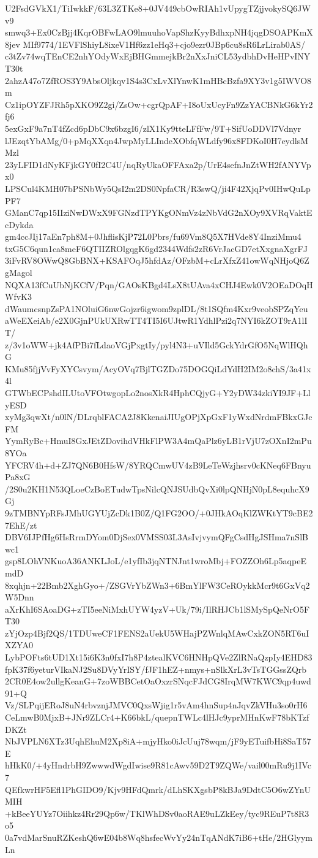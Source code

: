 U2FsdGVkX1/TiIwkkF/63L3ZTKe8+0JV449cbOwRIAh1vUpygTZjjvokySQ6JWv9
smwq3+Ex0CzBjj4KqrOBFwLAO9lmuuhoVapShzKyyBdhxpNH4jqgDSOAPKmX8jev
MIf9774/1EVFlShiyL8ixeV1Hf6zz1eHq3+cjo9ezr0JBp6cu8sR6LrLirab0AS/
c3tZv74wqTEnCE2nhYOdyWxEjBHGmmejkBr2nXxJniCL53ydbhDvHeHPvINYT30t
2ahzA47o7ZfROS3Y9AbsOljkqv1S4s3CxLvXlYnwK1mHBcBzfa9XY3v1g5IWVO8m
Cz1ipOYZFJRh5pXKO9Z2gi/ZsOw+cgrQpAF+I8oUxUcyFn9ZzYACBNkG6kYr2fj6
5exGxF9a7nT4fZcd6pDbC9x6bzgI6/zlX1Ky9tteLFfFw/9T+SifUoDDVl7Vdnyr
lJEzqtYbAMg/0+pMqXXqn4JwpMyLLIndeXObfqWLdfy96x8FDKoI0H7eydlsMMzl
23yLFID1dNyKFjkGY0fI2C4U/nqRyUkaOFFAxa2p/UrE4sefnJnZtWH2fANYVpx0
LPSCul4KMH07bPSNbWy5QsI2m2DS0NpfaCR/R3swQ/ji4F42XjqPv0IHwQuLpPF7
GManC7qp15IIziNwDWxX9FGNzdTPYKgONmVz4zNbVdG2nXOy9XVRqVaktEcDykda
gm4ccJIj17aEn7ph8M+0JhflisKjP72L0Pbrs/fu69Vm8Q5X7HVde8Y4InziMmu4
txG5C6qun1ca8meF6QTIIZROlgqgK6gd2344Wdfs2zR6VrJacGD7etXxgnaXgrFJ
3iFvRV8OWwQ8GbBNX+KSAFOqJ5hfdAz/OFzbM+cLrXfxZ41owWqNHjoQ6ZgMagol
NQXA13fCuUbNjKCfV/Pqn/GAOsKBgd4LsX8tUAva4xCHJ4Ewk0V2OEaDOqHWfvK3
dWaumcsnpZsPA1NOluiG6nwGojzr6igwom9zplDL/8t1SQfm4Kxr9veobSPZqYeu
aWeEXeiAb/e2X0GjnPUkUXRwTT4TI5I6UJtwR1YdhlPzi2q7NYI6kZOT9rA1lIT/
z/3v1oWW+jk4AfPBi7fLdaoVGjPxgtIy/pyl4N3+uVIld5GckYdrGfO5NqWlHQhG
KMu85fjjVvFyXYCsvym/AcyOVq7BjlTGZDo75DOGQiLdYdH2IM2o8chS/3a41x4l
GTWbECPshdILUtoVFOtwgopLo2nosXkR4HphCQjyG+Y2yDW34zkiYI9JF+LlyESD
xyMg3qwXt/n0lN/DLrqblFACA2J8KkenaiJIUgOPjXpGxF1yWxdNrdmFBkxGJcFM
YymRyBc+HmuI8GxJEtZDovihdVHkFlPW3A4mQaPlz6yLB1rVjU7zOXnI2mPu8YOa
YFCRV4h+d+ZJ7QN6B0HfsW/8YRQCmwUV4zB9LeTeWzjhsrv0cKNeq6FBnyuPa8xG
/2S0u2KH1N53QLoeCzBoETudwTpsNilcQNJSUdbQvXi0lpQNHjN0pL8equhcX9Gj
9zTMBNYpRFsJMhUGYUjZcDk1B0Z/Q1FG2OO/+0JHkAOqKlZWKtYT9cBE27EhE/zt
DBV6IJPfHg6HsRrmDYom0DjSex0VMSS03L3AsIvjvymQFgCsdHgJSHma7nSlBwc1
gsp8LOhVNKuoA36ANKLJoL/e1yfIb3jqNTNJnt1wroMbj+FOZZOh6Lp5aqpeEmdD
8xqhjn+22Bmb2XghGyo+/ZSGVrYbZWn3+6BmYlFW3CeROykkMcr9t6GxVq2W5Dnn
aXrKhI6SAoaDG+zTI5eeNiMxhUYW4yzV+Uk/79i/IlRHJCb1lSMySpQeNrO5FT30
zYjOzp4Bjf2QS/1TDUweCF1FENS2aUekU5WHajPZWnlqMAwCxkZON5RT6uIXZYA0
LybPOFts6tUD1Xt15i6K3n0fxI7h8P4ztealKVC6HNHpQVe2ZlRNaQzpIy4EHD83
fpK37f6yeturVIkaNJ2Su8DVyYrISY/fJF1hEZ+nmys+nSlkXrL3vTsTGGssZQrb
2CR0E4ow2ullgKeanG+7zoWBBCetOaOxzrSNqcFJdCG8IrqMW7KWC9qp4uwd91+Q
Vz/SLPqijERoJ8uN4rbvznjJMVC0QxsWjig1r5vAm4hnSup4nJqvZkVHu3so0rH6
CeLmwB0MjxB+JNr9ZLCr4+K66bkL/quepnTWLc4lHJc9yprMHnKwF78bKTzfDKZt
NbJVPLN6XTz3UqhEhuM2Xp8iA+mjyHko0iJcUuj78wqm/jF9yETuifbHi8SaT57E
hHkK0/+4yHndrbH9ZwwwdWgdIwise9R81cAwv59D2T9ZQWe/vail00mRu9j1IVc7
QEfkwrHF5Efl1PhGIDO9/Kjv9HFdQmrk/dLhSKXgsbP8kBJa9DdtC5O6wZYnUMIH
+kBeeYUYz7Oiihkz4Rr29Qp6w/TKlWhDSv0aoRAE9uLZkEey/tyc9REuP7t8R3o5
0a7vdMarSnuRZKeshQ6wE04b8Wq8hsfecWvYy24nTqANdK7iB6+tHe/2HGlyymLn
